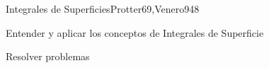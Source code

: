 \begin{syllabus}
\begin{unit}{Integrales de Superficies}{Protter69,Venero94}{8}
   \begin{unitgoals}
         \item  Entender y aplicar los conceptos de Integrales de Superficie
         \item  Resolver problemas
   \end{unitgoals}
\end{unit}

\begin{coursebibliography}
\end{coursebibliography}

\end{syllabus}
